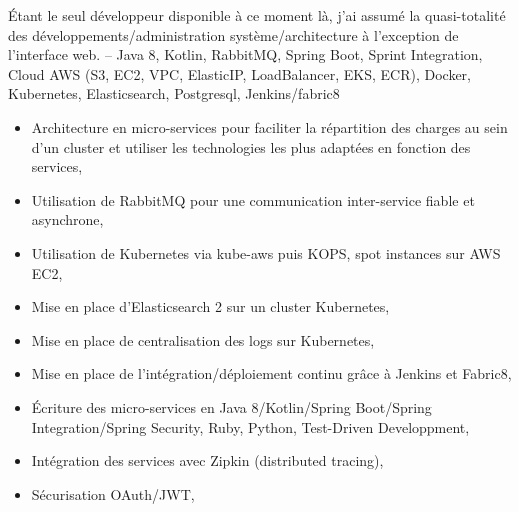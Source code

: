 \documentclass[11pt,a4paper]{moderncv}
\begin{document}
{\begin{itemize}
{        Étant le seul développeur disponible à ce moment là, j'ai assumé la quasi-totalité des développements/administration système/architecture à l'exception de l'interface web.
        {\tiny -- Java 8, Kotlin, RabbitMQ, Spring Boot, Sprint Integration, Cloud AWS (S3, EC2, VPC, ElasticIP, LoadBalancer, EKS, ECR), Docker, Kubernetes, Elasticsearch, Postgresql, Jenkins/fabric8}
        \begin{itemize}
        \item Architecture en micro-services pour faciliter la répartition des charges au sein d'un cluster et utiliser les technologies les plus adaptées en fonction des services,
        \item Utilisation de RabbitMQ pour une communication inter-service fiable et asynchrone,
        \item Utilisation de Kubernetes via kube-aws puis KOPS, spot instances sur AWS EC2,
        \item Mise en place d'Elasticsearch 2 sur un cluster Kubernetes,
        \item Mise en place de centralisation des logs sur Kubernetes,
        \item Mise en place de l'intégration/déploiement continu grâce à Jenkins et Fabric8,
        \item Écriture des micro-services en Java 8/Kotlin/Spring Boot/Spring Integration/Spring Security, Ruby, Python, Test-Driven Developpment,
        \item Intégration des services avec Zipkin (distributed tracing),
        \item Sécurisation OAuth/JWT,
        \end{itemize}
      }
\end{itemize}
}
\end{document}
